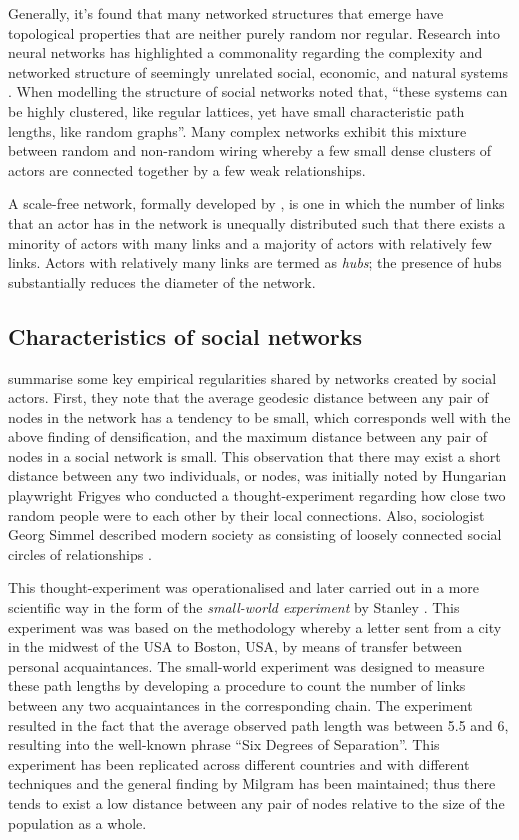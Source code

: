 Generally, it's found that many networked structures that emerge have topological properties that are neither purely random nor regular. Research into neural networks has highlighted a commonality regarding the complexity and networked structure of seemingly unrelated social, economic, and natural systems \citep{SpornsTononi2005, Sporns2010}. When modelling the structure of social networks \citet[p.~440]{WattsStrogatz1998} noted that, ``these systems can be highly clustered, like regular lattices, yet have small characteristic path lengths, like random graphs''. Many complex networks exhibit this mixture between random and non-random wiring whereby a few small dense clusters of actors are connected together by a few weak relationships.

A scale-free network, formally developed by \citet{BarabasiAlbert1999}, is one in which the number of links that an actor has in the network is unequally distributed such that there exists a minority of actors with many links and a majority of actors with relatively few links. Actors with relatively many links are termed as \emph{hubs}; the presence of hubs substantially reduces the diameter of the network.

\subsection{Characteristics of social networks}

\citet{JacksonRogers2007} summarise some key empirical regularities shared by networks created by social actors. First, they note that the average geodesic distance between any pair of nodes in the network has a tendency to be small, which corresponds well with the above finding of densification, and the maximum distance between any pair of nodes in a social network is small. This observation that there may exist a short distance between any two individuals, or nodes, was initially noted by Hungarian playwright Frigyes \citet{Karinthy1929} who conducted a thought-experiment regarding how close two random people were to each other by their local connections. Also, sociologist Georg Simmel described modern society as consisting of loosely connected social circles of relationships \citep{Simmel1950}.

This thought-experiment was operationalised and later carried out in a more scientific way in the form of the \emph{small-world experiment} by Stanley \citet{Milgram1967}. This experiment was was based on the methodology whereby a letter sent from a city in the midwest of the USA to Boston, USA, by means of transfer between personal acquaintances. The small-world experiment was designed to measure these path lengths by developing a procedure to count the number of links between any two acquaintances in the corresponding chain. The experiment resulted in the fact that the average observed path length was between 5.5 and 6, resulting into the well-known phrase ``Six Degrees of Separation''. This experiment has been replicated across different countries and with different techniques and the general finding by Milgram has been maintained; thus there tends to exist a low distance between any pair of nodes relative to the size of the population as a whole.


